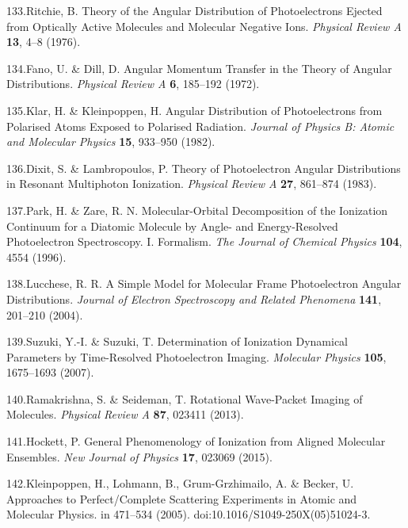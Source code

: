 \documentclass[10pt]{article}
\begin{document}
\label{csl:133}133.Ritchie, B. {Theory of the Angular Distribution of Photoelectrons Ejected from Optically Active Molecules and Molecular Negative Ions}. \textit{Physical Review A} \textbf{13}, 4–8 (1976).

\label{csl:134}134.Fano, U. \& Dill, D. {Angular {{Momentum Transfer}} in the {{Theory}} of {{Angular Distributions}}}. \textit{Physical Review A} \textbf{6}, 185–192 (1972).

\label{csl:135}135.Klar, H. \& Kleinpoppen, H. {Angular Distribution of Photoelectrons from Polarised Atoms Exposed to Polarised Radiation}. \textit{Journal of Physics B: Atomic and Molecular Physics} \textbf{15}, 933–950 (1982).

\label{csl:136}136.Dixit, S. \& Lambropoulos, P. {Theory of Photoelectron Angular Distributions in Resonant Multiphoton Ionization}. \textit{Physical Review A} \textbf{27}, 861–874 (1983).

\label{csl:137}137.Park, H. \& Zare, R. N. {Molecular-Orbital Decomposition of the Ionization Continuum for a Diatomic Molecule by Angle- and Energy-Resolved Photoelectron Spectroscopy. {{I}}. {{Formalism}}}. \textit{The Journal of Chemical Physics} \textbf{104}, 4554 (1996).

\label{csl:138}138.Lucchese, R. R. {A Simple Model for Molecular Frame Photoelectron Angular Distributions}. \textit{Journal of Electron Spectroscopy and Related Phenomena} \textbf{141}, 201–210 (2004).

\label{csl:139}139.Suzuki, Y.-I. \& Suzuki, T. {Determination of Ionization Dynamical Parameters by Time-Resolved Photoelectron Imaging}. \textit{Molecular Physics} \textbf{105}, 1675–1693 (2007).

\label{csl:140}140.Ramakrishna, S. \& Seideman, T. {Rotational Wave-Packet Imaging of Molecules}. \textit{Physical Review A} \textbf{87}, 023411 (2013).

\label{csl:141}141.Hockett, P. {General Phenomenology of Ionization from Aligned Molecular Ensembles}. \textit{New Journal of Physics} \textbf{17}, 023069 (2015).

\label{csl:142}142.Kleinpoppen, H., Lohmann, B., {Grum-Grzhimailo}, A. \& Becker, U. {Approaches to {{Perfect}}/{{Complete Scattering Experiments}} in {{Atomic}} and {{Molecular Physics}}}. in 471–534 (2005). doi:10.1016/S1049-250X(05)51024-3.
\end{document}
